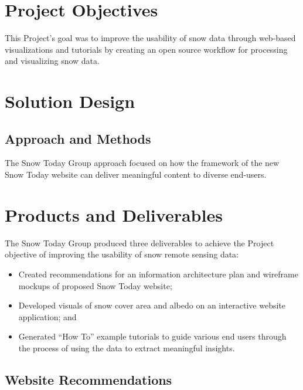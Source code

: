 \documentclass[
]{book}
\providecommand{\tightlist}{%
  \setlength{\itemsep}{0pt}\setlength{\parskip}{0pt}}
\begin{document}
\hypertarget{objectives}{%
\chapter{Project Objectives}\label{objectives}}

This Project's goal was to improve the usability of snow data through web-based visualizations and tutorials by creating an open source workflow for processing and visualizing snow data.

\hypertarget{solution}{%
\chapter{Solution Design}\label{solution}}

\hypertarget{approach-and-methods}{%
\section{Approach and Methods}\label{approach-and-methods}}

The Snow Today Group approach focused on how the framework of the new Snow Today website can deliver meaningful content to diverse end-users.

\hypertarget{deliverables}{%
\chapter{Products and Deliverables}\label{deliverables}}

The Snow Today Group produced three deliverables to achieve the Project objective of improving the usability of snow remote sensing data:

\begin{itemize}
\tightlist
\item
  Created recommendations for an information architecture plan and wireframe mockups of proposed Snow Today website;
\item
  Developed visuals of snow cover area and albedo on an interactive website application; and
\item
  Generated ``How To'' example tutorials to guide various end users through the process of using the data to extract meaningful insights.
\end{itemize}

\hypertarget{website-recommendations}{%
\section{Website Recommendations}\label{website-recommendations}}
\end{document}
